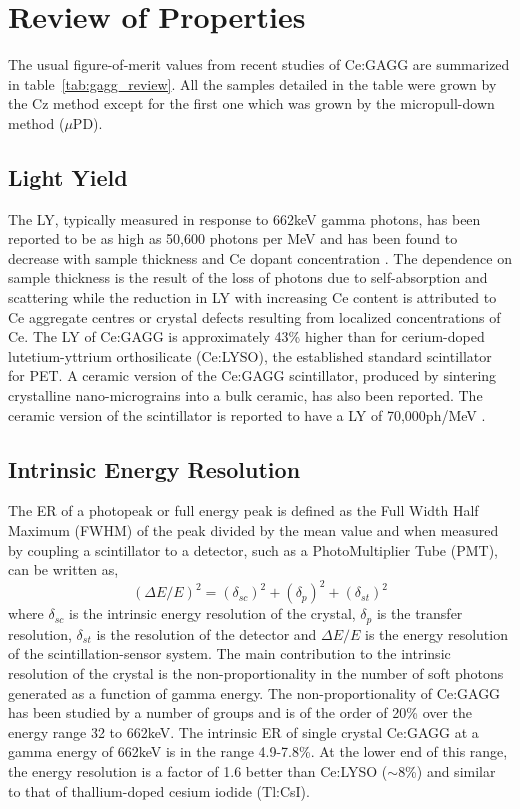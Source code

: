 \documentclass[journal]{IEEEtran}
\begin{document}
\section{Review of Properties}

The usual figure-of-merit values from recent studies of Ce:GAGG are summarized in table~\ref{tab:gagg_review}. All the samples detailed in the table were grown by the Cz method except for the first one which was grown by the micropull-down method ($\mu$PD).

\subsection{Light Yield}
The LY, typically measured in response to 662keV gamma photons, has been reported to be as high as 50,600 photons per MeV \cite{prusa:lightyeild} and has been found to decrease with sample thickness \cite{prusa:lightyeild, sakthong:gagg} and Ce dopant concentration \cite{gagg:kamada03, prusa:lightyeild, Kamada:ce_conc, gagg:drozdowski}. The dependence on sample thickness is the result of the loss of photons due to self-absorption and scattering while the reduction in LY with increasing Ce content is attributed to Ce aggregate centres or crystal defects resulting from localized concentrations of Ce. 
The LY of Ce:GAGG is approximately 43\% higher than for cerium-doped lutetium-yttrium orthosilicate (Ce:LYSO), the established standard scintillator for PET. A ceramic version of the Ce:GAGG scintillator, produced by sintering crystalline nano-micrograins into a bulk ceramic, has also been reported. The ceramic version of the scintillator is reported to have a LY of 70,000ph/MeV \cite{yan:gagg}. 
  
\subsection{Intrinsic Energy Resolution}

The ER of a photopeak or full energy peak is defined as the Full Width Half Maximum (FWHM) of the peak divided by the mean value and when measured by coupling a scintillator to a detector, such as a PhotoMultiplier Tube (PMT), can be written as,
\begin{equation}
(\Delta{}E/E)^{2} = (\delta{}_{sc})^{2} + (\delta{}_{p})^{2} + (\delta{}_{st})^{2}
\end{equation}
\noindent{}where $\delta_{sc}$ is the intrinsic energy resolution of the crystal, $\delta{}_{p}$ is the transfer resolution, $\delta_{st}$ is the resolution of the detector and $\Delta{}E/E$ is the energy resolution of the scintillation-sensor system. The main contribution to the intrinsic resolution of the crystal is the non-proportionality in the number of soft photons generated as a function of gamma energy. The non-proportionality of Ce:GAGG has been studied by a number of groups and is of the order of 20\% over the energy range 32 to 662keV. The intrinsic ER of single crystal Ce:GAGG at a gamma energy of 662keV is in the range 4.9-7.8\%. At the lower end of this range, the energy resolution is a factor of 1.6 better than Ce:LYSO ($\sim$8\%) and similar to that of thallium-doped cesium iodide (Tl:CsI).   
\end{document}
